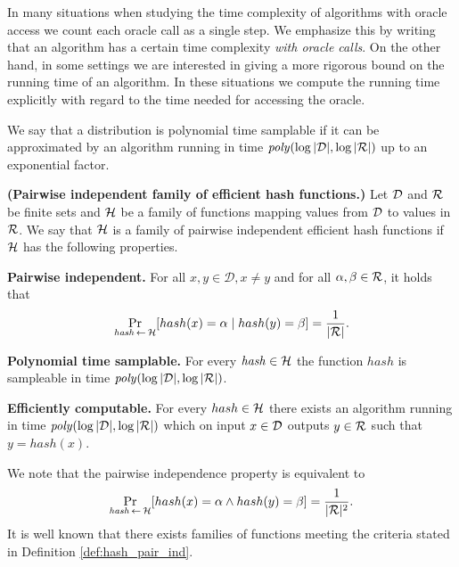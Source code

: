 In many situations when studying the time complexity of algorithms with oracle access we count each oracle call as a single step.
We emphasize this by writing that an algorithm has a certain time complexity \textit{with oracle calls}.
On the other hand, in some settings we are interested in giving a more rigorous bound on the running time of an algorithm.
In these situations we compute the running time explicitly with regard to the time needed for accessing the oracle.
\begin{definition}
We say that a distribution is \textnormal{polynomial time samplable} if it can be
approximated by an algorithm running in time $\mathit{poly}(\log|\mathcal{D}|, \log|\mathcal{R}|)$
up to an exponential factor.
\end{definition}

\begin{definition}\textbf{(Pairwise independent family of efficient hash functions.)}
  \label{def:hash_pair_ind}
Let $\mathcal{D}$ and $\mathcal{R}$ be finite sets and $\mathcal{H}$ be a family of functions mapping values from $\mathcal{D}$ to values in $\mathcal{R}$.
We say that $\mathcal{H}$ is a \textnormal{family of pairwise independent efficient hash functions}
if $\mathcal{H}$ has the following properties.

\textbf{Pairwise independent.} For all $x, y \in \mathcal{D}, x \neq y$ and for all $\alpha, \beta \in \mathcal{R}$, it holds that
\begin{displaymath}
\underset{\hash \la0 \cH}{\Pr}[hash(x) = \alpha \mid hash(y) = \beta] = \frac{1}{|\cR|}.
\end{displaymath}

\textbf{Polynomial time samplable.} For every $\mathit{hash} \in \mathcal{H}$ the function $\mathit{hash}$ is sampleable in time $\mathit{poly}(\log|\mathcal{D}|, \log|\mathcal{R}|)$.

\textbf{Efficiently computable.}
For every $hash \in \mathcal{H}$ there exists an algorithm running in time $\mathit{poly}(\log|\mathcal{D}|, \log|\mathcal{R}|)$ which
on input $x \in \mathcal{D}$ outputs $y \in \mathcal{R}$ such that $y = hash(x)$.
\end{definition}

We note that the pairwise independence property is equivalent to
\begin{displaymath}
\underset{\hash \la0 \cH}{\Pr}[hash(x) = \alpha \land hash(y) = \beta] = \frac{1}{|\cR|^2}.
\end{displaymath}
It is well known \cite{Carter:1977:UCH:800105.803400} that there exists families of functions meeting the criteria stated in Definition \ref{def:hash_pair_ind}.

